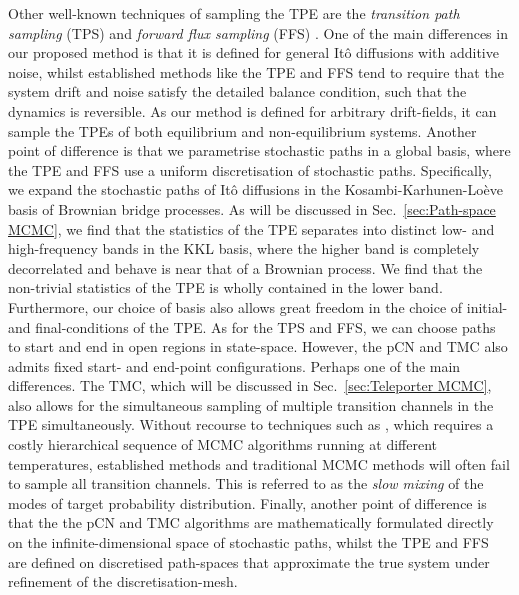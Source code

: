 Other well-known techniques of sampling the TPE are the \textit{transition path sampling} (TPS) \citep{dellagoTransitionPathSampling1998, dellagoCalculationReactionRate1999, dellagoEfficientTransitionPath1998a, bolhuisTransitionPathSampling, bolhuisTransitionPathSampling2002} and \textit{forward flux sampling} (FFS) \citep{escobedoTransitionPathSampling2009, allenForwardFluxSamplingtype2006a, hussainStudyingRareEvents2020}. One of the main
 differences in our proposed method is that it is defined for general It\^{o} diffusions with additive noise, whilst established methods like the TPE and FFS tend to require that the system drift and noise satisfy the detailed balance condition, such that the dynamics is reversible. As our method is defined for arbitrary drift-fields, it can sample the TPEs of both equilibrium and non-equilibrium systems. Another point of difference is that we parametrise stochastic paths in a global basis, where the TPE and FFS use a uniform discretisation of stochastic paths. Specifically, we expand the stochastic paths of It\^{o} diffusions in the Kosambi-Karhunen-Lo\`eve basis of Brownian bridge processes. As will be discussed in Sec.~\ref{sec:Path-space MCMC}, we find that the statistics of the TPE separates into distinct low- and high-frequency bands in the KKL basis, where the higher band is completely decorrelated and behave is near that of a Brownian process. We find that the non-trivial statistics of the TPE is wholly contained in the lower band. Furthermore, our choice of basis also allows great freedom in the choice of initial- and final-conditions of the TPE. As for the TPS and FFS, we can choose paths to start and end in open regions in state-space. However, the pCN and TMC also admits fixed start- and end-point configurations. Perhaps one of the main differences. The TMC, which will be discussed in Sec.~\ref{sec:Teleporter MCMC}, also allows for the simultaneous sampling of multiple transition channels in the TPE simultaneously. Without recourse to techniques such as \citep{earlParallelTemperingTheory2005, fujisakiOnsagerMachlupActionbased2010}, which requires a costly hierarchical sequence of MCMC algorithms running at different temperatures, established methods and traditional MCMC methods will often fail to sample all transition channels. This is referred to as the \textit{slow mixing} \citep{holdenMixingMCMCAlgorithms2019} of the modes of target probability distribution. Finally, another point of difference is that the the pCN and TMC algorithms are mathematically formulated directly on the infinite-dimensional space of stochastic paths, whilst the TPE and FFS are defined on discretised path-spaces that approximate the true system under refinement of the discretisation-mesh.

